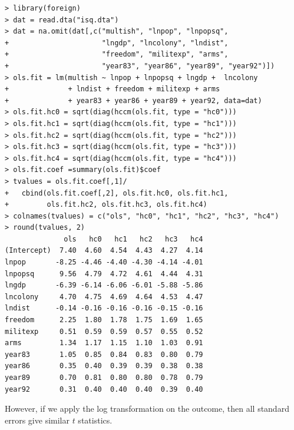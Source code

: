 \begin{lstlisting}
> library(foreign)
> dat = read.dta("isq.dta")
> dat = na.omit(dat[,c("multish", "lnpop", "lnpopsq", 
+                      "lngdp", "lncolony", "lndist", 
+                      "freedom", "militexp", "arms", 
+                      "year83", "year86", "year89", "year92")])
> ols.fit = lm(multish ~ lnpop + lnpopsq + lngdp +  lncolony 
+              + lndist + freedom + militexp + arms 
+              + year83 + year86 + year89 + year92, data=dat)
> ols.fit.hc0 = sqrt(diag(hccm(ols.fit, type = "hc0")))
> ols.fit.hc1 = sqrt(diag(hccm(ols.fit, type = "hc1")))
> ols.fit.hc2 = sqrt(diag(hccm(ols.fit, type = "hc2")))
> ols.fit.hc3 = sqrt(diag(hccm(ols.fit, type = "hc3")))
> ols.fit.hc4 = sqrt(diag(hccm(ols.fit, type = "hc4")))
> ols.fit.coef =summary(ols.fit)$coef
> tvalues = ols.fit.coef[,1]/
+   cbind(ols.fit.coef[,2], ols.fit.hc0, ols.fit.hc1, 
+         ols.fit.hc2, ols.fit.hc3, ols.fit.hc4)
> colnames(tvalues) = c("ols", "hc0", "hc1", "hc2", "hc3", "hc4")
> round(tvalues, 2)
              ols   hc0   hc1   hc2   hc3   hc4
(Intercept)  7.40  4.60  4.54  4.43  4.27  4.14
lnpop       -8.25 -4.46 -4.40 -4.30 -4.14 -4.01
lnpopsq      9.56  4.79  4.72  4.61  4.44  4.31
lngdp       -6.39 -6.14 -6.06 -6.01 -5.88 -5.86
lncolony     4.70  4.75  4.69  4.64  4.53  4.47
lndist      -0.14 -0.16 -0.16 -0.16 -0.15 -0.16
freedom      2.25  1.80  1.78  1.75  1.69  1.65
militexp     0.51  0.59  0.59  0.57  0.55  0.52
arms         1.34  1.17  1.15  1.10  1.03  0.91
year83       1.05  0.85  0.84  0.83  0.80  0.79
year86       0.35  0.40  0.39  0.39  0.38  0.38
year89       0.70  0.81  0.80  0.80  0.78  0.79
year92       0.31  0.40  0.40  0.40  0.39  0.40
\end{lstlisting}

However, if we apply the log transformation on the outcome, then all standard errors give similar $t$ statistics. 

